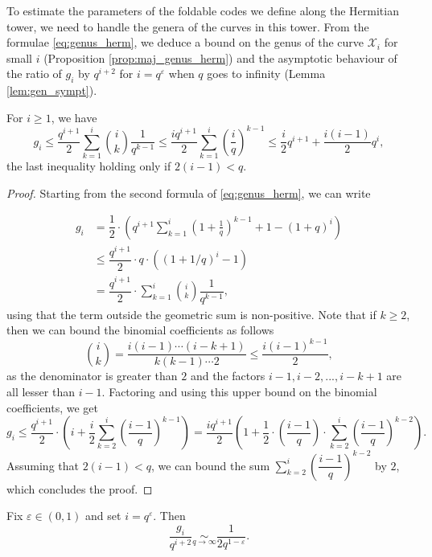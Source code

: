 \documentclass[a4paper,USenglish,autoref]{lipics-v2021}
\renewcommand\epsilon{\varepsilon}
\newcommand\calX{\mathcal{X}}
\newcommand{\cd}{\cdot}
\begin{document}
To estimate the parameters of the foldable codes we define along the Hermitian tower, we need to handle the genera of the curves in this tower. From the formulae \eqref{eq:genus_herm}, we deduce a bound on the genus of the curve $\calX_i$ for small $i$ (Proposition \ref{prop:maj_genus_herm}) and the asymptotic behaviour of the ratio of $g_i$ by $q^{i+2}$ for $i=q^{\epsilon}$ when $q$ goes to infinity (Lemma \ref{lem:gen_sympt}).

\begin{proposition}\label{prop:maj_genus_herm}
	For $i \geq 1$, we have
	\[g_i \leq \dfrac{q^{i+1}}{2} \sum\limits_{k=1}^i \binom{i}{k} \dfrac{1}{q^{k-1}} \leq \dfrac{iq^{i+1}}{2} \sum\limits_{k=1}^i \left(\dfrac{i}{q}\right)^{k-1} \leq \dfrac{i}{2}q^{i+1} + \dfrac{i(i-1)}{2}q^i,\]
	the last inequality holding only if $2(i-1) < q$.
\end{proposition}

\begin{proof}
	Starting from the second formula of \eqref{eq:genus_herm}, we can write
	
	\begin{align*} g_i  &= \dfrac{1}{2} \cd \left(q^{i+1}\sum\limits_{k=1}^i \left(1+\frac{1}{q}\right)^{k-1} +1 -(1+q)^i\right)\\ 
    &\leq \dfrac{q^{i+1}}{2} \cd q \cd ((1+1/q)^i-1) \\ &= \dfrac{q^{i+1}}{2} \cd \sum\limits_{k=1}^i \binom{i}{k} \dfrac{1}{q^{k-1}},
    \end{align*}
	using that the term outside the geometric sum is non-positive. Note that if $k \geq 2$, then we can bound the binomial coefficients as follows
	\[\binom{i}{k} = \dfrac{i(i-1) \cdots (i-k+1)}{k(k-1) \cdots 2} \leq \dfrac{i(i-1)^{k-1}}{2},\] 
	as the denominator is greater than $2$ and the factors $i-1,i-2,...,i-k+1$ are all lesser than $i-1$. Factoring and using this upper bound on the binomial coefficients, we get
	\[  g_i \leq \dfrac{q^{i+1}}{2} \cd \left( i + \frac{i}{2} \sum\limits_{k=2}^i \left(\dfrac{i-1}{q}\right)^{k-1}\right) = \dfrac{iq^{i+1}}{2} \left( 1 + \frac{1}{2} \cd \left(\frac{i-1}{q}\right) \cd \sum\limits_{k=2}^i \left(\dfrac{i-1}{q}\right)^{k-2}\right).\]
	Assuming that $2(i-1) < q$, we can bound the sum  $\sum\limits_{k=2}^i \left(\dfrac{i-1}{q}\right)^{k-2}$ by $2$, which concludes the proof.
\end{proof}

\begin{lemma}\label{lem:gen_sympt}
	Fix $\epsilon \in (0,1)$ and set $i = q^{\epsilon}$. Then
	\[\frac{g_i}{q^{i+2}} \underset{q \rightarrow \infty}{\sim} \frac{1}{2q^{1-\epsilon}}.\]
\end{lemma}
\end{document}
